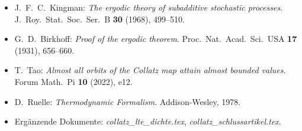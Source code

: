 \documentclass[12pt,a4paper]{article}
\begin{document}
\begin{itemize}
  \item J.\ F.\ C.\ Kingman: \textit{The ergodic theory of subadditive stochastic
    processes}. J.\ Roy.\ Stat.\ Soc.\ Ser.\ B \textbf{30} (1968), 499--510.
  \item G.\ D.\ Birkhoff: \textit{Proof of the ergodic theorem}. Proc.\ Nat.\
    Acad.\ Sci.\ USA \textbf{17} (1931), 656--660.
  \item T.\ Tao: \textit{Almost all orbits of the Collatz map attain almost
    bounded values}. Forum Math.\ Pi \textbf{10} (2022), e12.
  \item D.\ Ruelle: \textit{Thermodynamic Formalism}. Addison-Wesley, 1978.
  \item Ergänzende Dokumente: \textit{collatz\_lte\_dichte.tex},
    \textit{collatz\_schlussartikel.tex}.
\end{itemize}
\end{document}
